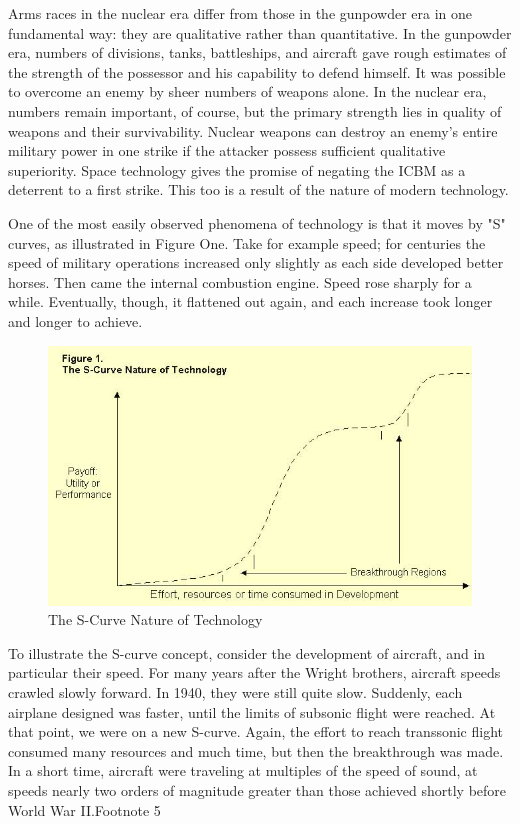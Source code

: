 \documentclass[a4paper,12pt]{book}
\begin{document}
Arms races in the nuclear era differ from those in the gunpowder era in one fundamental way: they are qualitative rather than quantitative. In the gunpowder era, numbers of divisions, tanks, battleships, and aircraft gave rough estimates of the strength of the possessor and his capability to defend himself. It was possible to overcome an enemy by sheer numbers of weapons alone. In the nuclear era, numbers remain important, of course, but the primary strength lies in quality of weapons and their survivability. Nuclear weapons can destroy an enemy's entire military power in one strike if the attacker possess sufficient qualitative superiority. Space technology gives the promise of negating the ICBM as a deterrent to a first strike. This too is a result of the nature of modern technology.

One of the most easily observed phenomena of technology is that it moves by "S" curves, as illustrated in Figure One. Take for example speed; for centuries the speed of military operations increased only slightly as each side developed better horses. Then came the internal combustion engine. Speed rose sharply for a while. Eventually, though, it flattened out again, and each increase took longer and longer to achieve.
\begin{figure}
    \includegraphics[width=\textwidth,height=\textheight,keepaspectratio]{./fig-1.jpg}
    \caption{The S-Curve Nature of Technology}
    \label{fig:S-Curve}
\end{figure}

To illustrate the S-curve concept, consider the development of aircraft, and in particular their speed. For many years after the Wright brothers, aircraft speeds crawled slowly forward. In 1940, they were still quite slow. Suddenly, each airplane designed was faster, until the limits of subsonic flight were reached. At that point, we were on a new S-curve. Again, the effort to reach transsonic flight consumed many resources and much time, but then the breakthrough was made. In a short time, aircraft were traveling at multiples of the speed of sound, at speeds nearly two orders of magnitude greater than those achieved shortly before World War II.Footnote 5
\end{document}
